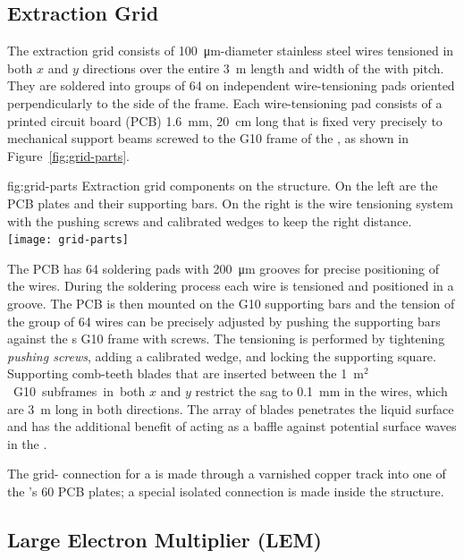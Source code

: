 \subsection{Extraction Grid}
\label{sec:fddp-crp-grid}
The extraction grid consists of \SI{100}{\micro\meter}-diameter stainless steel wires tensioned in both $x$ and $y$ directions over the entire \SI{3}{m} length and width of the  with \dpstrippitch pitch. They are soldered into groups of \num{64} on independent wire-tensioning pads oriented perpendicularly to the side of the  frame. Each wire-tensioning pad consists of a printed circuit board (PCB) \SI{1.6}{mm}, \SI{20}{cm} long that is fixed very precisely to mechanical support beams screwed to the G10 frame of the , as shown in Figure~\ref{fig:grid-parts}.
\begin{dunefigure}{fig:grid-parts}
{Extraction grid components on the  structure. On the left are the PCB plates and their supporting bars. On the right is the %
wire tensioning system with the pushing screws and calibrated wedges to keep the right distance.}
\texttt{[image: grid-parts]}
\end{dunefigure}

The PCB has \num{64} soldering pads with \SI{200}{\micro\meter} grooves for precise positioning of the wires. During the %
soldering process each wire is tensioned and positioned in a groove. The PCB is then mounted on the G10 supporting bars and the tension of the group of \num{64} wires can be precisely adjusted by pushing the supporting bars against the s G10 frame with screws. The tensioning is performed by tightening \textit{pushing screws}, adding a calibrated wedge, and locking the supporting square.
Supporting comb-teeth blades that are inserted between the \SI{1}{m$^2$} G10 subframes in both $x$ and $y$ restrict the sag to \SI{0.1}{mm} in the wires, which are \SI{3}{m} long in both directions. The array of blades penetrates the liquid surface and has the additional benefit of acting as a baffle against potential surface waves in the \lar.

The grid- connection for a  is made through a varnished copper track into one of the 's \num{60} PCB plates; a special isolated connection  is made inside the  structure.

\subsection{Large Electron Multiplier (LEM)}
\label{sec:fddp-crp-lem}

